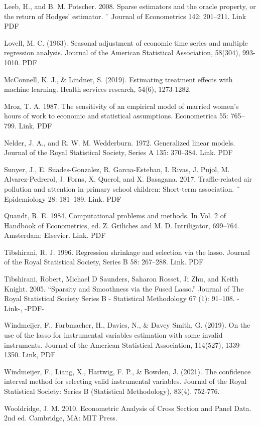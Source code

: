 {Leeb, H., and B. M. Potscher. 2008. Sparse estimators and the oracle property, or the return of Hodges’ estimator. ¨
Journal of Econometrics 142: 201–211. Link PDF

Lovell, M. C. (1963). Seasonal adjustment of economic time series and multiple regression analysis. Journal of the American Statistical Association, 58(304), 993-1010. PDF

McConnell, K. J., \& Lindner, S. (2019). Estimating treatment effects with machine learning. Health services research, 54(6), 1273-1282.

Mroz, T. A. 1987. The sensitivity of an empirical model of married women’s hours of work to economic and statistical
assumptions. Econometrica 55: 765–799. Link, PDF


Nelder, J. A., and R. W. M. Wedderburn. 1972. Generalized linear models. Journal of the Royal Statistical Society,
Series A 135: 370–384. Link. PDF

Sunyer, J., E. Suades-Gonzalez, R. Garcıa-Esteban, I. Rivas, J. Pujol, M. Alvarez-Pedrerol, J. Forns, X. Querol, and
X. Basagana. 2017. Traffic-related air pollution and attention in primary school children: Short-term association. ˜
Epidemiology 28: 181–189. Link.
PDF

Quandt, R. E. 1984. Computational problems and methods. In Vol. 2 of Handbook of Econometrics, ed. Z. Griliches
and M. D. Intriligator, 699–764. Amsterdam: Elsevier. Link. PDF

Tibshirani, R. J. 1996. Regression shrinkage and selection via the lasso. Journal of the Royal Statistical Society,
Series B 58: 267–288. Link. PDF

Tibshirani, Robert, Michael D Saunders, Saharon Rosset, Ji Zhu, and Keith Knight. 2005. “Sparsity and Smoothness via the Fused Lasso.” Journal of The Royal Statistical Society Series B - Statistical Methodology 67 (1): 91–108. -Link-, -PDF-

Windmeijer, F., Farbmacher, H., Davies, N., \& Davey Smith, G. (2019). On the use of the lasso for instrumental variables estimation with some invalid instruments. Journal of the American Statistical Association, 114(527), 1339-1350. Link, PDF

Windmeijer, F., Liang, X., Hartwig, F. P., \& Bowden, J. (2021). The confidence interval method for selecting valid instrumental variables. Journal of the Royal Statistical Society: Series B (Statistical Methodology), 83(4), 752-776.


Wooldridge, J. M. 2010. Econometric Analysis of Cross Section and Panel Data. 2nd ed. Cambridge, MA: MIT Press.

}
